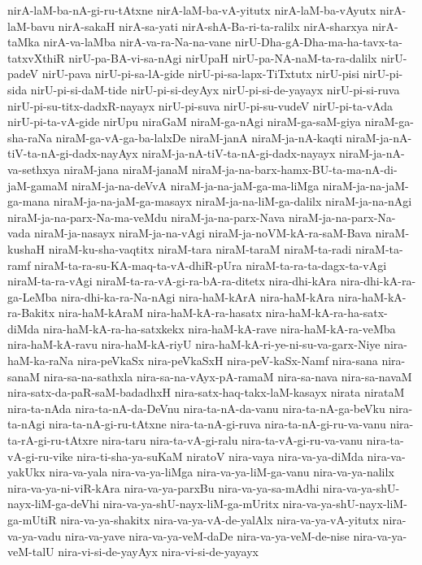 {nirA-laM-ba-nA-gi-ru-tAtxne
nirA-laM-ba-vA-yitutx
nirA-laM-ba-vAyutx
nirA-laM-bavu
nirA-sakaH
nirA-sa-yati
nirA-shA-Ba-ri-ta-ralilx
nirA-sharxya
nirA-taMka
nirA-va-laMba
nirA-va-ra-Na-na-vane
nirU-Dha-gA-Dha-ma-ha-tavx-ta-tatxvXthiR
nirU-pa-BA-vi-sa-nAgi
nirUpaH
nirU-pa-NA-naM-ta-ra-dalilx
nirU-padeV
nirU-pava
nirU-pi-sa-lA-gide
nirU-pi-sa-lapx-TiTxtutx
nirU-pisi
nirU-pi-sida
nirU-pi-si-daM-tide
nirU-pi-si-deyAyx
nirU-pi-si-de-yayayx
nirU-pi-si-ruva
nirU-pi-su-titx-dadxR-nayayx
nirU-pi-suva
nirU-pi-su-vudeV
nirU-pi-ta-vAda
nirU-pi-ta-vA-gide
nirUpu
niraGaM
niraM-ga-nAgi
niraM-ga-saM-giya
niraM-ga-sha-raNa
niraM-ga-vA-ga-ba-lalxDe
niraM-janA
niraM-ja-nA-kaqti
niraM-ja-nA-tiV-ta-nA-gi-dadx-nayAyx
niraM-ja-nA-tiV-ta-nA-gi-dadx-nayayx
niraM-ja-nA-va-sethxya
niraM-jana
niraM-janaM
niraM-ja-na-barx-hamx-BU-ta-ma-nA-di-jaM-gamaM
niraM-ja-na-deVvA
niraM-ja-na-jaM-ga-ma-liMga
niraM-ja-na-jaM-ga-mana
niraM-ja-na-jaM-ga-masayx
niraM-ja-na-liM-ga-dalilx
niraM-ja-na-nAgi
niraM-ja-na-parx-Na-ma-veMdu
niraM-ja-na-parx-Nava
niraM-ja-na-parx-Na-vada
niraM-ja-nasayx
niraM-ja-na-vAgi
niraM-ja-noVM-kA-ra-saM-Bava
niraM-kushaH
niraM-ku-sha-vaqtitx
niraM-tara
niraM-taraM
niraM-ta-radi
niraM-ta-ramf
niraM-ta-ra-su-KA-maq-ta-vA-dhiR-pUra
niraM-ta-ra-ta-dagx-ta-vAgi
niraM-ta-ra-vAgi
niraM-ta-ra-vA-gi-ra-bA-ra-ditetx
nira-dhi-kAra
nira-dhi-kA-ra-ga-LeMba
nira-dhi-ka-ra-Na-nAgi
nira-haM-kArA
nira-haM-kAra
nira-haM-kA-ra-Bakitx
nira-haM-kAraM
nira-haM-kA-ra-hasatx
nira-haM-kA-ra-ha-satx-diMda
nira-haM-kA-ra-ha-satxkekx
nira-haM-kA-rave
nira-haM-kA-ra-veMba
nira-haM-kA-ravu
nira-haM-kA-riyU
nira-haM-kA-ri-ye-ni-su-va-garx-Niye
nira-haM-ka-raNa
nira-peVkaSx
nira-peVkaSxH
nira-peV-kaSx-Namf
nira-sana
nira-sanaM
nira-sa-na-sathxla
nira-sa-na-vAyx-pA-ramaM
nira-sa-nava
nira-sa-navaM
nira-satx-da-paR-saM-badadhxH
nira-satx-haq-takx-laM-kasayx
nirata
nirataM
nira-ta-nAda
nira-ta-nA-da-DeVnu
nira-ta-nA-da-vanu
nira-ta-nA-ga-beVku
nira-ta-nAgi
nira-ta-nA-gi-ru-tAtxne
nira-ta-nA-gi-ruva
nira-ta-nA-gi-ru-va-vanu
nira-ta-rA-gi-ru-tAtxre
nira-taru
nira-ta-vA-gi-ralu
nira-ta-vA-gi-ru-va-vanu
nira-ta-vA-gi-ru-vike
nira-ti-sha-ya-suKaM
niratoV
nira-vaya
nira-va-ya-diMda
nira-va-yakUkx
nira-va-yala
nira-va-ya-liMga
nira-va-ya-liM-ga-vanu
nira-va-ya-nalilx
nira-va-ya-ni-viR-kAra
nira-va-ya-parxBu
nira-va-ya-sa-mAdhi
nira-va-ya-shU-nayx-liM-ga-deVhi
nira-va-ya-shU-nayx-liM-ga-mUritx
nira-va-ya-shU-nayx-liM-ga-mUtiR
nira-va-ya-shakitx
nira-va-ya-vA-de-yalAlx
nira-va-ya-vA-yitutx
nira-va-ya-vadu
nira-va-yave
nira-va-ya-veM-daDe
nira-va-ya-veM-de-nise
nira-va-ya-veM-talU
nira-vi-si-de-yayAyx
nira-vi-si-de-yayayx
}

